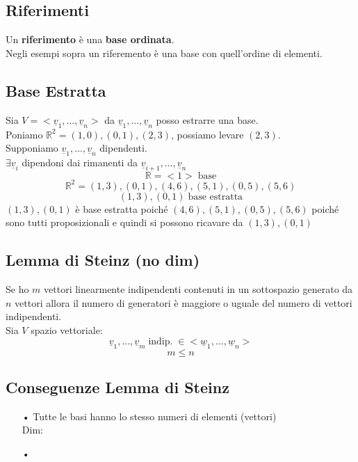 \subsection{Riferimenti}
Un \textbf{riferimento} è una \textbf{base ordinata}.\\
Negli esempi sopra un riferemento è una base con quell'ordine di elementi.

\subsection{Base Estratta}
Sia $V = <\underline{v}_1,...,\underline{v}_n>$ da $\underline{v}_1,...,\underline{v}_n$ posso estrarre una base.\\
Poniamo $\mathbb{R}^2 = (1,0),(0,1),(2,3)$, possiamo levare $(2,3)$.\\
Supponiamo $\underline{v}_1,...,\underline{v}_n$ dipendenti.\\
$ \exists \underline{v}_i $ dipendoni dai rimanenti da $\underline{v}_{i+1},...,\underline{v}_n$
$$ \mathbb{R} = <1> \; \text{base} $$
$$ \mathbb{R}^2 = (1,3),(0,1),(4,6),(5,1),(0,5),(5,6) $$
$$ (1,3),(0,1) \; \text{base estratta}$$
$(1,3),(0,1)$ è base estratta poiché $(4,6),(5,1),(0,5),(5,6) $ poiché sono tutti proposizionali e quindi si possono ricavare da $(1,3),(0,1)$

\subsection{Lemma di Steinz (no dim)}
Se ho $m$ vettori linearmente indipendenti contenuti in un sottospazio generato da $n$
vettori allora il numero di generatori è maggiore o uguale del numero di vettori indipendenti.\\
Sia $V$ spazio vettoriale:
$$ \underline{v}_1,...,\underline{v}_m \; \text{indip.} \; \in <\underline{w}_1,...,\underline{w}_n> $$
$$ m \le n $$

\subsection{Conseguenze Lemma di Steinz}
\begin{itemize}
\item[•] Tutte le basi hanno lo stesso numeri di elementi (vettori)\\
Dim:
\item[•] 
\end{itemize}

